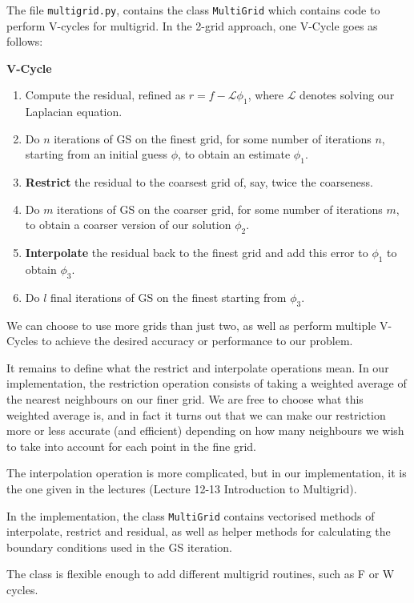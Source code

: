 \documentclass[12pt]{article}
\begin{document}
    The file \texttt{multigrid.py}, contains the class \texttt{MultiGrid} which contains code to perform V-cycles for multigrid. In the 2-grid approach, one V-Cycle goes as follows:

    \textbf{V-Cycle}
    \begin{enumerate}
        \item Compute the residual, refined as $r = f - \mathscr{L}\phi_1$, where $\mathscr{L}$ denotes solving our Laplacian equation.
        \item Do $n$ iterations of GS on the finest grid, for some number of iterations $n$, starting from an initial guess $\phi$, to obtain an estimate $\phi_1$.
        \item \textbf{Restrict} the residual to the coarsest grid of, say, twice the coarseness.
        \item Do $m$ iterations of GS on the coarser grid, for some number of iterations $m$, to obtain a coarser version of our solution $\phi_2$.
        \item \textbf{Interpolate} the residual back to the finest grid and add this error to $\phi_1$ to obtain $\phi_3$.
        \item Do $l$ final iterations of GS on the finest starting from $\phi_3$.
    \end{enumerate}

    We can choose to use more grids than just two, as well as perform multiple V-Cycles to achieve the desired accuracy or performance to our problem.

    It remains to define what the restrict and interpolate operations mean. In our implementation, the restriction operation consists of taking a weighted average of the nearest neighbours on our finer grid. We are free to choose what this weighted average is, and in fact it turns out that we can make our restriction more or less accurate (and efficient) depending on how many neighbours we wish to take into account for each point in the fine grid.

    The interpolation operation is more complicated, but in our implementation, it is the one given in the lectures (Lecture 12-13 Introduction to Multigrid).

    In the implementation, the class \texttt{MultiGrid} contains vectorised methods of interpolate, restrict and residual, as well as helper methods for calculating the boundary conditions used  in the GS iteration.

    The class is flexible enough to add different multigrid routines, such as F or W cycles.
\end{document}
